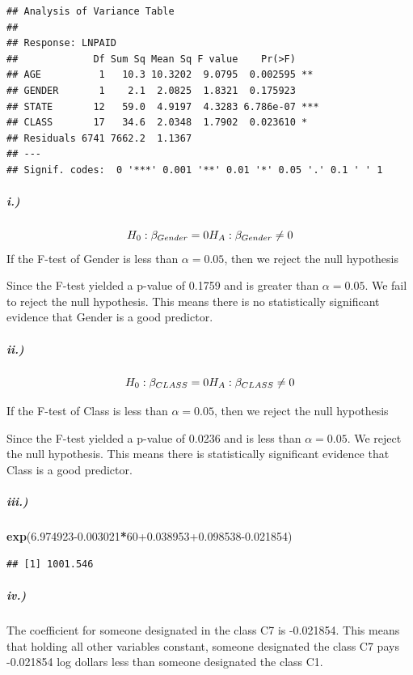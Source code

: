 \documentclass[
]{article}
\newenvironment{Shaded}{\begin{snugshade}}{\end{snugshade}}
\newcommand{\DecValTok}[1]{\textcolor[rgb]{0.00,0.00,0.81}{#1}}
\newcommand{\FloatTok}[1]{\textcolor[rgb]{0.00,0.00,0.81}{#1}}
\newcommand{\FunctionTok}[1]{\textcolor[rgb]{0.13,0.29,0.53}{\textbf{#1}}}
\newcommand{\NormalTok}[1]{#1}
\newcommand{\SpecialCharTok}[1]{\textcolor[rgb]{0.81,0.36,0.00}{\textbf{#1}}}
\begin{document}
\begin{verbatim}
## Analysis of Variance Table
## 
## Response: LNPAID
##             Df Sum Sq Mean Sq F value    Pr(>F)    
## AGE          1   10.3 10.3202  9.0795  0.002595 ** 
## GENDER       1    2.1  2.0825  1.8321  0.175923    
## STATE       12   59.0  4.9197  4.3283 6.786e-07 ***
## CLASS       17   34.6  2.0348  1.7902  0.023610 *  
## Residuals 6741 7662.2  1.1367                      
## ---
## Signif. codes:  0 '***' 0.001 '**' 0.01 '*' 0.05 '.' 0.1 ' ' 1
\end{verbatim}

\subparagraph{i.)}\label{i.-1}

\[
H_0: \beta_{Gender}=0 \\
H_A: \beta_{Gender}\not=0
\] If the F-test of Gender is less than \(\alpha=0.05\), then we reject
the null hypothesis

Since the F-test yielded a p-value of 0.1759 and is greater than
\(\alpha=0.05\). We fail to reject the null hypothesis. This means there
is no statistically significant evidence that Gender is a good
predictor.

\subparagraph{ii.)}\label{ii.-1}

\[
H_0: \beta_{CLASS}=0 \\
H_A: \beta_{CLASS}\not=0
\]

If the F-test of Class is less than \(\alpha=0.05\), then we reject the
null hypothesis

Since the F-test yielded a p-value of 0.0236 and is less than
\(\alpha=0.05\). We reject the null hypothesis. This means there is
statistically significant evidence that Class is a good predictor.

\subparagraph{iii.)}\label{iii.-1}

\begin{Shaded}
\begin{Highlighting}[]
\FunctionTok{exp}\NormalTok{(}\FloatTok{6.974923{-}0.003021}\SpecialCharTok{*}\DecValTok{60}\FloatTok{+0.038953+0.098538{-}0.021854}\NormalTok{)}
\end{Highlighting}
\end{Shaded}

\begin{verbatim}
## [1] 1001.546
\end{verbatim}

\subparagraph{iv.)}\label{iv.}

The coefficient for someone designated in the class C7 is -0.021854.
This means that holding all other variables constant, someone designated
the class C7 pays -0.021854 log dollars less than someone designated the
class C1.
\end{document}
